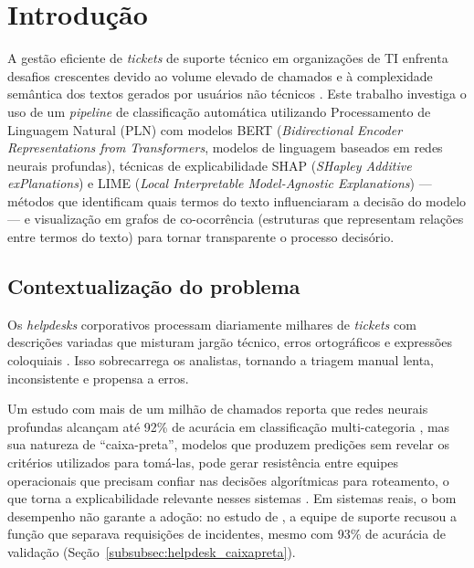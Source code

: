 \documentclass[
    12pt,                %
    openright,           %
    oneside,             %
    a4paper,             %
    english,             %
    brazil               %
]{abntex2}
\begin{document}
\textual

\chapter{Introdução}
\label{cap:introducao}

A gestão eficiente de \textit{tickets} de suporte técnico em 
organizações de TI enfrenta desafios crescentes devido ao 
volume elevado de chamados e à complexidade semântica dos 
textos gerados por usuários não técnicos \cite{zemp2021, 
razma2026}. Este trabalho investiga o uso de um 
\textit{pipeline} de classificação automática utilizando 
Processamento de Linguagem Natural (PLN) com modelos BERT 
(\textit{Bidirectional Encoder Representations from 
Transformers}, modelos de linguagem baseados em redes neurais 
profundas), técnicas de explicabilidade SHAP 
(\textit{SHapley Additive exPlanations}) e LIME 
(\textit{Local Interpretable Model-Agnostic Explanations}) 
— métodos que identificam quais termos do texto influenciaram 
a decisão do modelo — e visualização em grafos de 
co-ocorrência (estruturas que representam relações entre 
termos do texto) para tornar transparente o processo 
decisório.

\section{Contextualização do problema}
\label{sec:contexto}

Os \textit{helpdesks} corporativos processam diariamente milhares 
de \textit{tickets} com descrições variadas que misturam jargão 
técnico, erros ortográficos e expressões coloquiais \cite{zemp2021}. 
Isso sobrecarrega os analistas, tornando a triagem manual lenta, 
inconsistente e propensa a erros.

 Um estudo com mais de um milhão de chamados reporta que redes neurais profundas alcançam até 
 92\% de acurácia em classificação multi-categoria \cite{zemp2021}, mas sua natureza de ``caixa-preta'', modelos que produzem 
predições sem revelar os critérios utilizados para tomá-las, pode gerar 
resistência entre equipes operacionais que precisam confiar nas decisões 
algorítmicas para roteamento, o que torna a explicabilidade relevante 
nesses sistemas \cite{razma2026}. Em sistemas reais, o bom desempenho não garante a adoção: no estudo de , a equipe de suporte recusou a função que separava requisições de incidentes, mesmo com 93\% de acurácia de validação (Seção~\ref{subsubsec:helpdesk_caixapreta}).
\end{document}
